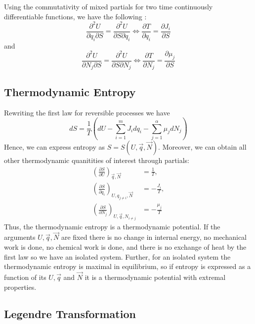 \documentclass[12pt, a4paper, oneside, openright, titlepage]{book}
\begin{document}
\begin{prop}
    Using the commutativity of mixed partials for two time continuously differentiable functions, we have the following : \begin{equation}
        \frac{\partial^2 U}{\partial q_i\partial S} = \frac{\partial^2 U}{\partial S\partial q_i} \iff \frac{\partial T}{\partial q_i} = \frac{\partial J_i}{\partial S}
    \end{equation}
    and \begin{equation}
        \frac{\partial^2U}{\partial N_j\partial S} = \frac{\partial^2 U}{\partial S\partial N_j} \iff \frac{\partial T}{\partial N_j} = \frac{\partial \mu_j}{\partial S}
    \end{equation}
\end{prop}

\subsection{Thermodynamic Entropy}

Rewriting the first law for reversible processes we have \begin{equation*}
    dS = \frac{1}{T}\left(dU-\sum_{i=1}^mJ_idq_i - \sum_{j=1}^{\alpha}\mu_jdN_j\right)
\end{equation*}
Hence, we can express entropy as $S = S(U,\vec{q},\vec{N})$. Moreover, we can obtain all other thermodynamic quanitities of interest through partials: \begin{align*}
    \left(\frac{\partial S}{\partial U}\right)_{\vec{q},\vec{N}} &= \frac{1}{T}, \\
    \left(\frac{\partial S}{\partial q_i}\right)_{U,q_{j\neq i},\vec{N}} &= -\frac{J_i}{T}, \\
    \left(\frac{\partial S}{\partial N_j}\right)_{U,\vec{q},N_{i\neq j}} &= -\frac{\mu_j}{T}
\end{align*}
Thus, the thermodynamic entropy is a thermodynamic potential. If the arguments $U,\vec{q},\vec{N}$ are fixed there is no change in internal energy, no mechanical work is done, no chemical work is done, and there is no exchange of heat by the first law so we have an isolated system. Further, for an isolated system the thermodynamic entropy is maximal in equilibrium, so if entropy is expressed as a function of its  $U,\vec{q}$ and $\vec{N}$ it is a thermodynamic potential with extremal properties.

\subsection{Legendre Transformation}
\end{document}
